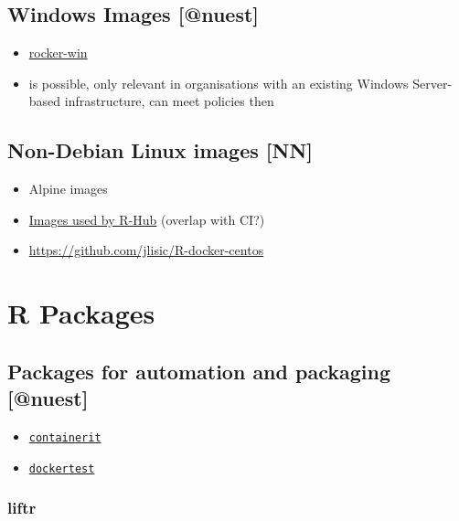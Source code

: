 \hypertarget{windows-images-nuest}{%
\subsection{Windows Images {[}@nuest{]}}\label{windows-images-nuest}}

\begin{itemize}
\tightlist
\item
  \href{https://github.com/nuest/rocker-win}{rocker-win}
\item
  is possible, only relevant in organisations with an existing Windows
  Server-based infrastructure, can meet policies then
\end{itemize}

\hypertarget{non-debian-linux-images-nn}{%
\subsection{Non-Debian Linux images
{[}NN{]}}\label{non-debian-linux-images-nn}}

\begin{itemize}
\tightlist
\item
  Alpine images
\item
  \href{https://github.com/r-hub/rhub-linux-builders}{Images used by
  R-Hub} (overlap with CI?)
\item
  \url{https://github.com/jlisic/R-docker-centos}
\end{itemize}

\hypertarget{r-packages}{%
\section{R Packages}\label{r-packages}}

\hypertarget{packages-for-automation-and-packaging-nuest}{%
\subsection{Packages for automation and packaging
{[}@nuest{]}}\label{packages-for-automation-and-packaging-nuest}}

\begin{itemize}
\tightlist
\item
  \href{https://github.com/o2r-project/containerit/}{\texttt{containerit}}
\item
  \href{https://github.com/traitecoevo/dockertest/}{\texttt{dockertest}}
\end{itemize}

\hypertarget{liftr}{%
\subsubsection{liftr}\label{liftr}}

